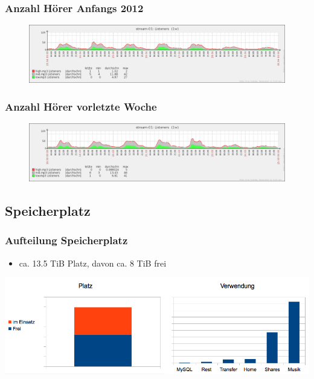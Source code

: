 \documentclass{beamer}
\begin{document}
  \frame
  {
  }

  \frame
  {
    \frametitle{Anzahl H\"orer Anfangs 2012}

    \begin{figure}
    \resizebox{300pt}{150pt}
    {
      \includegraphics[trim = 86pt 152pt 30pt 35pt, clip]{img/stream-2012.png}
    }
    \end{figure}
  }

  \frame
  {
    \frametitle{Anzahl H\"orer vorletzte Woche}
    
    \begin{figure}
    \resizebox{300pt}{150pt}
    {
      \includegraphics[trim = 86pt 152pt 30pt 35pt, clip]{img/stream-2013.png}
    }
    \end{figure}
  }

  \subsection*{Speicherplatz}

  \frame
  {
  }

  \frame
  {
    \frametitle{Aufteilung Speicherplatz}

    \begin{itemize}
    \item{ca. 13.5 TiB Platz, davon ca. 8 TiB frei}
    \end{itemize}

    \scalebox{0.32}
    {
      \includegraphics{img/hd-verwendung.png}
    }
  }
\end{document}
